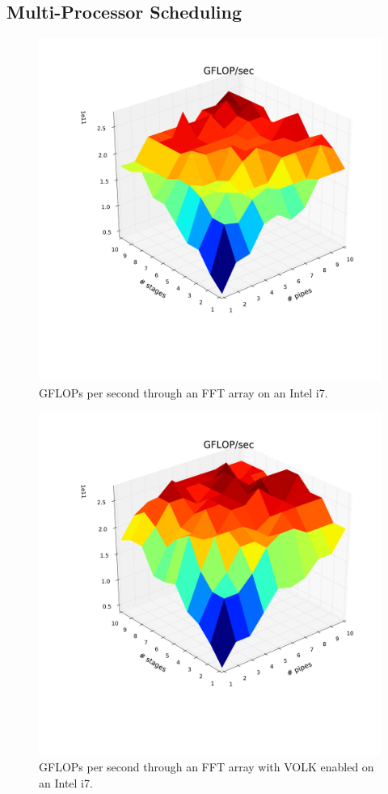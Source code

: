 \documentclass[english]{article}
\begin{document}
\subsection{Multi-Processor Scheduling}

\begin{figure}[htbp]
    \centering
    \includegraphics[width=\columnwidth]{fft_i7_generic.pdf}
    \caption{GFLOPs per second through an FFT array on an Intel i7.}
    \label{fig:fft_generic}
\end{figure}

\begin{figure}[htbp]
    \centering
    \includegraphics[width=\columnwidth]{fft_i7_volked.pdf}
    \caption{GFLOPs per second through an FFT array with VOLK enabled on an Intel i7.}
    \label{fig:fft_volk}
\end{figure}
\end{document}
